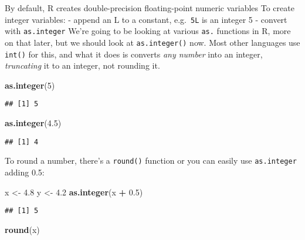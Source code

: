 \documentclass[
]{book}
\newenvironment{Shaded}{\begin{snugshade}}{\end{snugshade}}
\newcommand{\DecValTok}[1]{\textcolor[rgb]{0.00,0.00,0.81}{#1}}
\newcommand{\FloatTok}[1]{\textcolor[rgb]{0.00,0.00,0.81}{#1}}
\newcommand{\KeywordTok}[1]{\textcolor[rgb]{0.13,0.29,0.53}{\textbf{#1}}}
\newcommand{\NormalTok}[1]{#1}
\newcommand{\OperatorTok}[1]{\textcolor[rgb]{0.81,0.36,0.00}{\textbf{#1}}}
\newcommand{\StringTok}[1]{\textcolor[rgb]{0.31,0.60,0.02}{#1}}
\begin{document}
By default, R creates double-precision floating-point numeric variables
To create integer variables:
- append an L to a constant, e.g.~\texttt{5L} is an integer 5
- convert with \texttt{as.integer}
We're going to be looking at various \texttt{as.} functions in R, more on that later,
but we should look at \texttt{as.integer()} now. Most other languages use \texttt{int()} for this,
and what it does is converts \emph{any number} into an integer, \emph{truncating} it to an
integer, not rounding it.

\begin{Shaded}
\begin{Highlighting}[]
\KeywordTok{as.integer}\NormalTok{(}\DecValTok{5}\NormalTok{)}
\end{Highlighting}
\end{Shaded}

\begin{verbatim}
## [1] 5
\end{verbatim}

\begin{Shaded}
\begin{Highlighting}[]
\KeywordTok{as.integer}\NormalTok{(}\FloatTok{4.5}\NormalTok{)}
\end{Highlighting}
\end{Shaded}

\begin{verbatim}
## [1] 4
\end{verbatim}

To round a number, there's a \texttt{round()} function or you can easily use \texttt{as.integer} adding 0.5:

\begin{Shaded}
\begin{Highlighting}[]
\NormalTok{x <-}\StringTok{ }\FloatTok{4.8}
\NormalTok{y <-}\StringTok{ }\FloatTok{4.2}
\KeywordTok{as.integer}\NormalTok{(x }\OperatorTok{+}\StringTok{ }\FloatTok{0.5}\NormalTok{)}
\end{Highlighting}
\end{Shaded}

\begin{verbatim}
## [1] 5
\end{verbatim}

\begin{Shaded}
\begin{Highlighting}[]
\KeywordTok{round}\NormalTok{(x)}
\end{Highlighting}
\end{Shaded}
\end{document}
